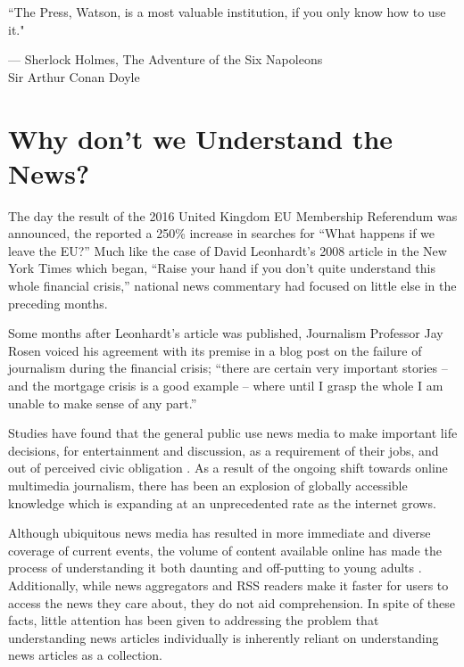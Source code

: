 \vspace{-0.5cm}
\epigraph{``The Press, Watson, is a most valuable institution, if you only know how to use it."}{--- \textup{Sherlock Holmes}, The Adventure of the Six Napoleons\\[0.2cm] \textup{Sir Arthur Conan Doyle}}

\section*{Why don't we Understand the News?}

The day the result of the 2016 United Kingdom EU Membership Referendum was announced, the \citeauthor{googletrends} reported a 250\% increase in searches for ``What happens if we leave the EU?'' Much like the case of David Leonhardt's 2008 article in the New York Times which began, ``Raise your hand if you don't quite understand this whole financial crisis,'' national news commentary had focused on little else in the preceding months.

Some months after Leonhardt's article was published, Journalism Professor Jay Rosen voiced his agreement with its premise in a blog post on the failure of journalism during the financial crisis; ``there are certain very important stories -- and the mortgage crisis is a good example -- where until I grasp the whole I am unable to make sense of any part.''\citep{NationalExplainer}

Studies have found that the general public use news media to make important life decisions, for entertainment and discussion, as a requirement of their jobs, and out of perceived civic obligation \citep{InformationCartography,UnderstandingTheParticipatoryNewsConsumer}. As a result of the ongoing shift towards online multimedia journalism, there has been an explosion of globally accessible knowledge which is expanding at an unprecedented rate as the internet grows. 

Although ubiquitous news media has resulted in more immediate and diverse coverage of current events, the volume of content available online has made the process of understanding it both daunting and off-putting to young adults \citep{anewmodelfornews}. Additionally, while news aggregators and RSS readers make it faster for users to access the news they care about, they do not aid comprehension. In spite of these facts, little attention has been given to addressing the problem that understanding news articles individually is inherently reliant on understanding news articles as a collection. 

